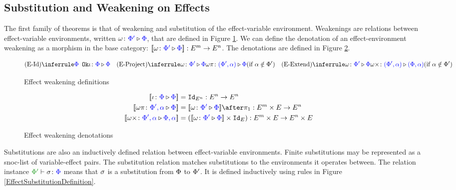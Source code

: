 \documentclass{Report}
\begin{document}
\subsection{Substitution and Weakening on Effects}\label{SectionEffectSubstitution}

The first family of theorems is that of weakening and substitution of the effect-variable environment. Weakenings are relations between effect-variable environments, written $\wrel{\w}{\P'}{\P}$, that are defined in Figure \ref{EffectWeakeningDefinition}. We can define the denotation of an effect-environment weakening as a morphism in the base category: $\deno{\wrelw{\P'}{\P}}: E^m \rightarrow E^n$. The denotations are defined in Figure \ref{EffectWeakeningDenotations}.

\begin{figure}[H]
    \centering
    \begin{framed}
        \[
    \ntreeruleI{\eid}{\ok{\P}}{\wrel{\i}{\P}{\P}}
    \quad
    \condtreeruleI{\eproject}{\wrel{\w}{\P'}{\P}}{\wrel{\w\pi}{(\P', \a)}{\P}}{\a\notin\P'}
    \quad
    \condtreeruleI{\eextend}{\wrel{\w}{\P'}{\P}}{\wrel{\w\x}{(\P', \a)}{(\P, \a)}}{\a\notin\P'}
\]
    \end{framed}
    \caption{Effect weakening definitions}
    \label{EffectWeakeningDefinition}
\end{figure}


\begin{figure}[H]
    \centering
    \begin{framed}
        \begin{align*}
            \deno{\wrel{\i}{\P}{\P}} & = \Id{E^n}: E^n \rightarrow E^n
            \\
            \deno{\wrel{\w\pi}{\P',\a}{\P}} & = \deno{\wrelw{\P'}{\P}}\after \p: E^m\times E\rightarrow E^n
            \\
            \deno{\wrel{\w\x}{\P',\a}{\P,\a}} & = (\deno{\wrelw{\P'}{\P}}\times \Id{E}): E^m\times E\rightarrow E^n\times E 
        \end{align*}
    \end{framed}
    \caption{Effect weakening denotations}
    \label{EffectWeakeningDenotations}
\end{figure}

Substitutions are also an inductively defined relation between effect-variable environments. Finite substitutions may be represented as a snoc-list of variable-effect pairs. The substitution relation matches substitutions to the environments it operates between. The relation instance $\typerelation{\P'}{\si}{\P}$ means that $\si$ is a substitution from $\P$ to $\P'$. It is defined inductively using rules in Figure \ref{EffectSubstitutionDefinition}.
\end{document}
